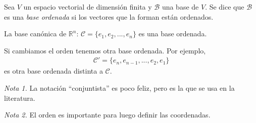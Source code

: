 \documentclass[handout]{beamer} %
\newcommand{\K}{\mathbb K}
\newcommand{\cC}{\mathcal{C}}
\newcommand{\cB}{\mathcal{B}}
\begin{document}
        
        \begin{frame}
        
        \begin{definicion}[3.5.1]
        Sea $V$ un espacio vectorial de dimensión finita y $\mathcal{B}$ una base de $V$. Se dice que $\cB$ es una \textit{base ordenada} si los vectores que la forman están ordenados. 
        \end{definicion}\pause
        
    
        \begin{ejemplo}
        La base canónica de $\mathbb{R}^n$:\; $\cC=\{e_1, e_2, ..., e_n\}$\; es una base ordenada. 
        
        
        Si cambiamos el orden tenemos otra base ordenada. Por ejemplo,
        \begin{align*}
        \cC'=\{e_n, e_{n-1}, ..., e_2, e_1\} 
        \end{align*}
        es otra base ordenada distinta a $\cC$.
    \end{ejemplo}\pause
    \textit{Nota 1.} La notación ``conjuntista'' es poco feliz, pero es la que se usa en la literatura.


    \textit{Nota 2.} El orden es importante para luego definir las coordenadas.
        \end{frame}
        
        
\end{document}
